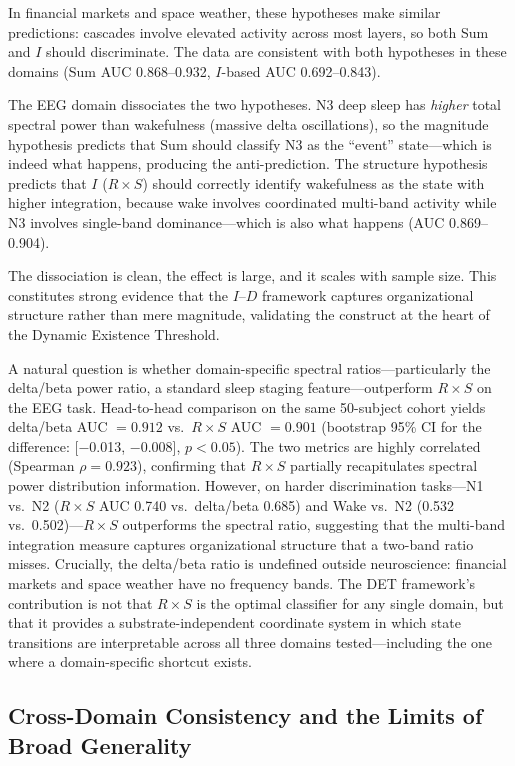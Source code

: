\documentclass[aip,cha,reprint,amsmath,amssymb,final]{revtex4-2}
\begin{document}
In financial markets and space weather, these hypotheses make similar predictions: cascades involve elevated activity across most layers, so both Sum and $I$ should discriminate. The data are consistent with both hypotheses in these domains (Sum AUC 0.868--0.932, $I$-based AUC 0.692--0.843).

The EEG domain dissociates the two hypotheses. N3 deep sleep has \emph{higher} total spectral power than wakefulness (massive delta oscillations), so the magnitude hypothesis predicts that Sum should classify N3 as the ``event'' state---which is indeed what happens, producing the anti-prediction. The structure hypothesis predicts that $I$ ($R \times S$) should correctly identify wakefulness as the state with higher integration, because wake involves coordinated multi-band activity while N3 involves single-band dominance---which is also what happens (AUC 0.869--0.904).

The dissociation is clean, the effect is large, and it scales with sample size. This constitutes strong evidence that the $I$--$D$ framework captures organizational structure rather than mere magnitude, validating the construct at the heart of the Dynamic Existence Threshold.

A natural question is whether domain-specific spectral ratios---particularly the delta/beta power ratio, a standard sleep staging feature---outperform $R \times S$ on the EEG task. Head-to-head comparison on the same 50-subject cohort yields delta/beta AUC $= 0.912$ vs.\ $R \times S$ AUC $= 0.901$ (bootstrap 95\% CI for the difference: [$-$0.013, $-$0.008], $p < 0.05$). The two metrics are highly correlated (Spearman $\rho = 0.923$), confirming that $R \times S$ partially recapitulates spectral power distribution information. However, on harder discrimination tasks---N1 vs.\ N2 ($R \times S$ AUC 0.740 vs.\ delta/beta 0.685) and Wake vs.\ N2 (0.532 vs.\ 0.502)---$R \times S$ outperforms the spectral ratio, suggesting that the multi-band integration measure captures organizational structure that a two-band ratio misses. Crucially, the delta/beta ratio is undefined outside neuroscience: financial markets and space weather have no frequency bands. The DET framework's contribution is not that $R \times S$ is the optimal classifier for any single domain, but that it provides a substrate-independent coordinate system in which state transitions are interpretable across all three domains tested---including the one where a domain-specific shortcut exists.

\subsection{Cross-Domain Consistency and the Limits of Broad Generality}
\end{document}
